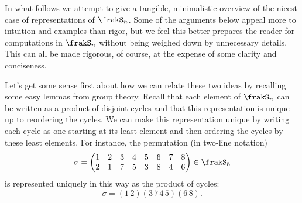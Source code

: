 \documentclass[12pt]{article}
\begin{document}
\begin{rmk}
	In what follows we attempt to give a tangible, minimalistic overview of the nicest case of representations of $\frakS_n$.
	Some of the arguments below appeal more to intuition and examples than rigor, but we feel this better prepares the reader 
	for computations in $\frakS_n$ without being weighed down by unnecessary details. This can all be made rigorous, of course, 
	at the expense of some clarity and conciseness. 
\end{rmk}
Let's get some sense first about how we can relate these two ideas by recalling some easy lemmas from 
group theory. Recall that each element of $\frakS_n$ can be written 
as a product of disjoint cycles and that this representation is unique up to reordering the cycles. We can make this 
representation unique by writing each cycle as one starting at its least element and then ordering the cycles by these least elements. 
For instance, the permutation (in two-line notation)
\[\sigma=\begin{pmatrix}1&2&3&4&5&6&7&8\\ 2&1&7&5&3&8&4&6\end{pmatrix}\in\frakS_8\]
is represented uniquely in this way as the product of cycles:
\[\sigma=(1\,2)(3\,7\,4\,5)(6\,8).\]
\end{document}
